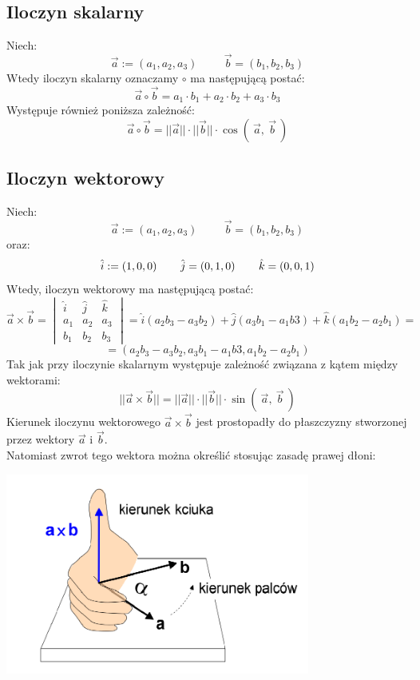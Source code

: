 \documentclass[a4paper]{article}
\begin{document}
    \subsection{\LARGE Iloczyn skalarny}
        \Large 
        Niech:
        \[\vec{a} := (a_1, a_2, a_3) \hspace{1cm} \vec{b} = (b_1, b_2, b_3) \]
        Wtedy iloczyn skalarny oznaczamy $\circ$ ma następującą postać:
        \[\vec{a} \circ \vec{b} = a_1 \cdot b_1 + a_2 \cdot b_2 + a_3 \cdot b_3\]
        Występuje również poniższa zależność:
         \[\vec{a} \circ \vec{b} = ||\vec{a}|| \cdot ||\vec{b}|| \cdot \cos{(\ \vec{a},\ {\vec{b}}\ )} \]
        
    \subsection{\LARGE Iloczyn wektorowy}
        \Large 
        Niech:
        \[\vec{a} := (a_1, a_2, a_3) \hspace{1cm} \vec{b} = (b_1, b_2, b_3) \]
        oraz:      
        \[\hat{i} := (1, 0, 0) \hspace{0,75cm} \hat{j} = (0, 1, 0) \hspace{0,75cm} \hat{k} = (0, 0, 1) \]
        Wtedy, iloczyn wektorowy ma następującą postać:
        \[
            \vec{a} \times \vec{b} = 
            \begin{vmatrix}
                \hat{i} & \hat{j} & \hat{k} \\
                a_1 & a_2 & a_3 \\
                b_1 & b_2 & b_3
            \end{vmatrix}
            = \hat{i}(a_2b_3 - a_3b_2) + \hat{j}(a_3b_1 - a_1b3) + \hat{k}(a_1b_2 - a_2b_1) =     
        \]
        \[ = (a_2b_3 - a_3b_2, a_3b_1 - a_1b3, a_1b_2 - a_2b_1 )\]
        Tak jak przy iloczynie skalarnym występuje zależność związana z kątem między wektorami:
        \[||\vec{a} \times \vec{b}|| = ||\vec{a}||\cdot ||\vec{b}|| \cdot \sin{(\ \vec{a},\ {\vec{b}}\ )}\]
        Kierunek iloczynu wektorowego $\vec{a} \times \vec{b}$ jest prostopadły do płaszczyzny 
        stworzonej przez wektory $\vec{a}$ i $\vec{b}$.\\ Natomiast zwrot tego wektora można określić stosując zasadę prawej dłoni: \\
        \begin{center}
            \includegraphics[width=10cm]{img/prawareka.png} 
        \end{center}
\end{document}

